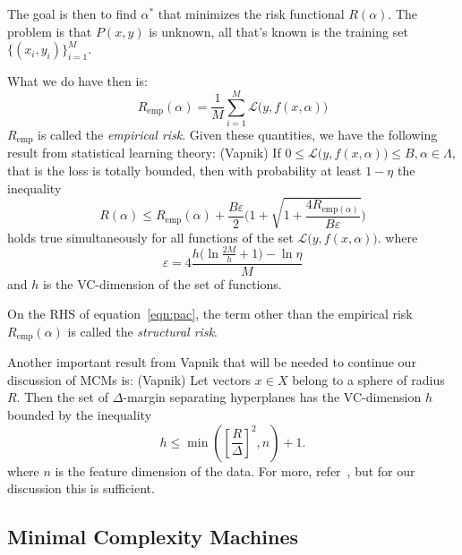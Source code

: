 \documentclass[11pt]{article}
\begin{document}
The goal is then to find $\alpha^*$ that minimizes the risk functional
$R(\alpha)$. The problem is that $P(x,y)$ is unknown, all that's known is the
training set $\{(x_i,y_i)\}_{i=1}^M$.\par
What we do have then is:
\begin{equation}
    R_{\text{emp}}(\alpha)=\frac{1}{M}\sum_{i=1}^M
    \mathcal{L}\bigl(y,f(x,\alpha)\bigr)
\end{equation}
$R_{\text{emp}}$ is called the {\em empirical risk}. Given these quantities, we
have the following result from statistical learning theory:
{\theorem (Vapnik) If $0\le\mathcal{L}\bigl(y,f(x,\alpha)\bigr)\le
B,\alpha\in\Lambda$, that is the loss is totally bounded, then with
probability at least $1-\eta$ the inequality
\begin{equation}
    \label{eqn:pac}
    R(\alpha)\le
    R_{\text{emp}}(\alpha)+\frac{B\varepsilon}{2}\Biggl(1+\sqrt{1+\frac{4R_{\text{emp}(\alpha)}}{B\varepsilon}}\Biggr)
\end{equation}
holds true simultaneously for all functions of the set
$\mathcal{L}\bigl(y,f(x,\alpha)\bigr)$. where
\begin{equation}
    \label{eq:vareps}
    \varepsilon = 4\frac{h\biggl(\ln\frac{2M}{h}+1\biggr)-\ln\eta}{M}
\end{equation} and $h$ is the VC-dimension of the set of functions.}\par
On the RHS of equation~\ref{eqn:pac}, the term other than the empirical risk
$R_{\text{emp}}(\alpha)$ is called the {\em structural risk}.\par
Another important result from Vapnik that will be needed to continue our
discussion of MCMs is:
{\theorem (Vapnik) Let vectors $x\in X$ belong to a sphere of radius $R$. Then
the set of $\Delta$-margin separating hyperplanes has the VC-dimension $h$
bounded by the inequality
\begin{equation}
    \label{eqn:vcbound}
    h\le\min\left(\left[\frac{R}{\Delta}\right]^2,n\right)+1.
\end{equation}} where $n$ is the feature dimension of the data.
For more, refer~\cite{slt}, but for our discussion this is sufficient.\par
\subsection{Minimal Complexity Machines}
\end{document}
